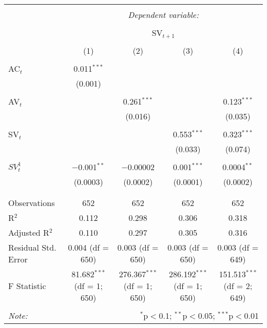 
\begin{table}[!htbp] \centering 
  \caption{} 
  \label{} 
\begin{tabular}{@{\extracolsep{5pt}}lcccc} 
\\[-1.8ex]\hline 
\hline \\[-1.8ex] 
 & \multicolumn{4}{c}{\textit{Dependent variable:}} \\ 
\cline{2-5} 
\\[-1.8ex] & \multicolumn{4}{c}{SV$_{t+1}$} \\ 
\\[-1.8ex] & (1) & (2) & (3) & (4)\\ 
\hline \\[-1.8ex] 
 AC$_{t}$ & 0.011$^{***}$ &  &  &  \\ 
  & (0.001) &  &  &  \\ 
  & & & & \\ 
 AV$_{t}$ &  & 0.261$^{***}$ &  & 0.123$^{***}$ \\ 
  &  & (0.016) &  & (0.035) \\ 
  & & & & \\ 
 SV$_{t}$ &  &  & 0.553$^{***}$ & 0.323$^{***}$ \\ 
  &  &  & (0.033) & (0.074) \\ 
  & & & & \\ 
 $SV^{1}_{t}$ & $-$0.001$^{**}$ & $-$0.00002 & 0.001$^{***}$ & 0.0004$^{**}$ \\ 
  & (0.0003) & (0.0002) & (0.0001) & (0.0002) \\ 
  & & & & \\ 
\hline \\[-1.8ex] 
Observations & 652 & 652 & 652 & 652 \\ 
R$^{2}$ & 0.112 & 0.298 & 0.306 & 0.318 \\ 
Adjusted R$^{2}$ & 0.110 & 0.297 & 0.305 & 0.316 \\ 
Residual Std. Error & 0.004 (df = 650) & 0.003 (df = 650) & 0.003 (df = 650) & 0.003 (df = 649) \\ 
F Statistic & 81.682$^{***}$ (df = 1; 650) & 276.367$^{***}$ (df = 1; 650) & 286.192$^{***}$ (df = 1; 650) & 151.513$^{***}$ (df = 2; 649) \\ 
\hline 
\hline \\[-1.8ex] 
\textit{Note:}  & \multicolumn{4}{r}{$^{*}$p$<$0.1; $^{**}$p$<$0.05; $^{***}$p$<$0.01} \\ 
\end{tabular} 
\end{table} 
